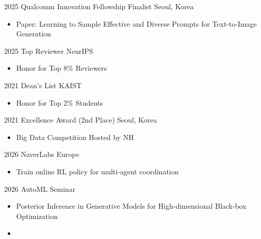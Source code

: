 \documentclass[10pt]{developercv} %
\begin{document}
\begin{entrylist}
    \entry
        {2025}
		{Qualcomm Innovation Fellowship Finalist}
		{Seoul, Korea}
        {\vspace{-5pt}
        \begin{itemize}[noitemsep,topsep=0pt,parsep=0pt,partopsep=0pt, leftmargin=0pt]
            \item[] Paper: Learning to Sample Effective and Diverse Prompts for Text-to-Image Generation
        \end{itemize}}
    \entry
        {2025}
		{Top Reviewer}
		{NeurIPS}
		{\vspace{-5pt}
        \begin{itemize}[noitemsep,topsep=0pt,parsep=0pt,partopsep=0pt, leftmargin=0pt]
            \item[] Honor for Top 8\% Reviewers
        \end{itemize}}
    \entry
        {2021}
		{Dean's List}
		{KAIST}
		{\vspace{-5pt}
        \begin{itemize}[noitemsep,topsep=0pt,parsep=0pt,partopsep=0pt, leftmargin=0pt]
            \item[] Honor for Top 2\% Students
        \end{itemize}}
    \entry
        {2021}
		{Excellence Award (2nd Place)}
		{Seoul, Korea}
		{\vspace{-5pt}
        \begin{itemize}[noitemsep,topsep=0pt,parsep=0pt,partopsep=0pt, leftmargin=0pt]
            \item[] Big Data Competition Hosted by NH
        \end{itemize}}
\end{entrylist}

\begin{entrylist}
    \entry
        {2026}
        {NaverLabs Europe}
        {}
        {\vspace{-5pt}
        \begin{itemize}[noitemsep,topsep=0pt,parsep=2pt,partopsep=0pt, leftmargin=0pt]
            \item[] Train online RL policy for multi-agent coordination
        \end{itemize}
        }
    \entry
        {2026}
        {AutoML Seminar}
        {}
        {\vspace{-5pt}
        \begin{itemize}[noitemsep,topsep=0pt,parsep=2pt,partopsep=0pt, leftmargin=0pt]
            \item[] Posterior Inference in Generative Models for High-dimensional Black-box Optimization
            \item[] [\href{https://www.youtube.com/watch?v=yTw5rshzoqA}{Video}]
        \end{itemize}
        }
\end{entrylist}
\end{document}
